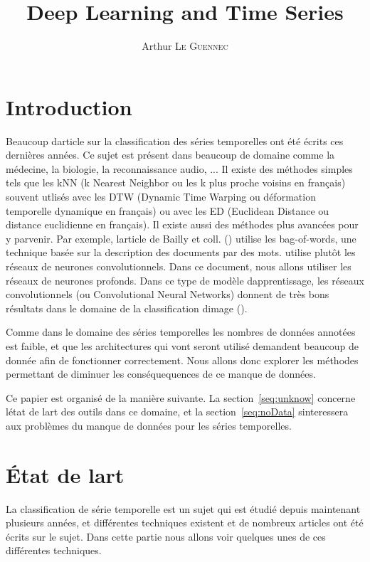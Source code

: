 \documentclass[11pt]{sdm}
\title{Deep Learning and Time Series}
\author{Arthur \textsc{Le Guennec}}
\begin{document}
\maketitle


\section{Introduction}

Beaucoup d\textquotesingle article sur la classification des s\'eries temporelles ont \'et\'e \'ecrits ces derni\`eres ann\'ees. Ce sujet est pr\'esent dans beaucoup de domaine comme la m\'edecine, la biologie, la reconnaissance audio, ... 
Il existe des m\'ethodes simples tels que les kNN (k Nearest Neighbor ou les k plus proche voisins en fran\c cais) souvent utlis\'es avec les DTW (Dynamic Time Warping ou d\'eformation temporelle dynamique en fran\c cais) ou avec les ED (Euclidean Distance ou distance euclidienne en fran\c cais).
Il existe aussi des m\'ethodes plus avanc\'ees pour y parvenir. Par exemple, l\textquotesingle article de Bailly et coll. (\cite{bailly2015bag}) utilise les bag-of-words, une technique bas\'ee sur la description des documents par des mots. \cite{zheng2014time} utilise plut\^ot les r\'eseaux de neurones convolutionnels.
Dans ce document, nous allons utiliser les r\'eseaux de neurones profonds. Dans ce type de mod\`ele d\textquotesingle apprentissage, les r\'eseaux convolutionnels (ou Convolutional Neural Networks) donnent de tr\`es bons r\'esultats dans le domaine de la classification d\textquotesingle image (\cite{chatfield2014return}).

Comme dans le domaine des s\'eries temporelles les nombres de donn\'ees annot\'ees est faible, et que les architectures qui vont seront utilis\'e demandent beaucoup de donn\'ee afin de fonctionner correctement. Nous allons donc explorer les m\'ethodes permettant de diminuer les cons\'equequences de ce manque de donn\'ees.

Ce papier est organis\'e de la mani\`ere suivante. La section~\ref{seq:unknow} concerne l\textquotesingle \'etat de l\textquotesingle art des outils dans ce domaine, et la section~\ref{seq:noData} s\textquotesingle interessera aux probl\`emes du manque de donn\'ees pour les s\'eries temporelles.
 

\section{\'Etat de l\textquotesingle art}
\label{seq:stateOfTheArt}
	La classification de s\'erie temporelle est un sujet qui est \'etudi\'e depuis maintenant plusieurs ann\'ees, et diff\'erentes techniques existent et de nombreux articles ont \'et\'e \'ecrits sur le sujet. Dans cette partie nous allons voir quelques unes de ces diff\'erentes techniques.
\end{document}
